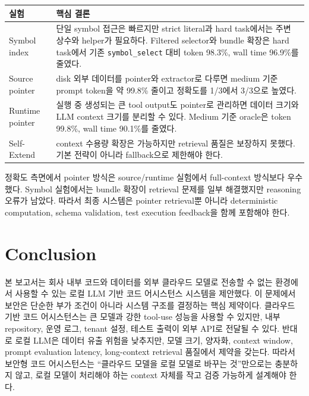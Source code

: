 \documentclass[11pt,a4paper]{article}
\begin{document}
\begin{table}[htbp]
\centering
\begin{tabularx}{\textwidth}{lY}
\toprule
실험 & 핵심 결론 \\
\midrule
Symbol index & 단일 symbol 접근은 빠르지만 strict literal과 hard task에서는 주변 상수와 helper가 필요하다. Filtered selector와 bundle 확장은 hard task에서 기존 \texttt{symbol\_select} 대비 token 98.3\%, wall time 96.9\%를 줄였다. \\
Source pointer & disk 외부 데이터를 pointer와 extractor로 다루면 medium 기준 prompt token을 약 99.8\% 줄이고 정확도를 1/3에서 3/3으로 높였다. \\
Runtime pointer & 실행 중 생성되는 큰 tool output도 pointer로 관리하면 데이터 크기와 LLM context 크기를 분리할 수 있다. Medium 기준 oracle은 token 99.8\%, wall time 90.1\%를 줄였다. \\
Self-Extend & context 수용량 확장은 가능하지만 retrieval 품질은 보장하지 못했다. 기본 전략이 아니라 fallback으로 제한해야 한다. \\
\bottomrule
\end{tabularx}
\end{table}

정확도 측면에서 pointer 방식은 source/runtime 실험에서 full-context 방식보다 우수했다. Symbol 실험에서는 bundle 확장이 retrieval 문제를 일부 해결했지만 reasoning 오류가 남았다. 따라서 최종 시스템은 pointer retrieval뿐 아니라 deterministic computation, schema validation, test execution feedback을 함께 포함해야 한다.

\section{Conclusion}

본 보고서는 회사 내부 코드와 데이터를 외부 클라우드 모델로 전송할 수 없는 환경에서 사용할 수 있는 로컬 LLM 기반 코드 어시스턴스 시스템을 제안했다. 이 문제에서 보안은 단순한 부가 조건이 아니라 시스템 구조를 결정하는 핵심 제약이다. 클라우드 기반 코드 어시스턴스는 큰 모델과 강한 tool-use 성능을 사용할 수 있지만, 내부 repository, 운영 로그, tenant 설정, 테스트 출력이 외부 API로 전달될 수 있다. 반대로 로컬 LLM은 데이터 유출 위험을 낮추지만, 모델 크기, 양자화, context window, prompt evaluation latency, long-context retrieval 품질에서 제약을 갖는다. 따라서 보안형 코드 어시스턴스는 ``클라우드 모델을 로컬 모델로 바꾸는 것''만으로는 충분하지 않고, 로컬 모델이 처리해야 하는 context 자체를 작고 검증 가능하게 설계해야 한다.
\end{document}
